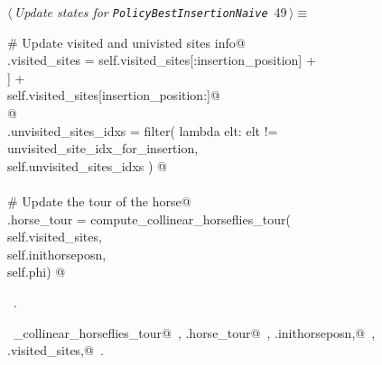 \documentclass[11.5pt]{report}
\begin{document}
\vspace{-0.8cm}\newchunk 

\begin{flushleft} \small\label{scrap73}\raggedright\small
{} $\langle\,${\itshape Update states for \texttt{PolicyBestInsertionNaive}}\nobreak\ {\footnotesize {49}}$\,\rangle\equiv$
\vspace{-1ex}
\begin{list}{}{} \item
\mbox{}\verb@# Update visited and univisted sites info@\\
\mbox{}\verb@self.visited_sites = self.visited_sites[:insertion_position]      +\@\\
\mbox{}\verb@                     [self.sites[unvisited_site_idx_for_insertion]] +\@\\
\mbox{}\verb@                     self.visited_sites[insertion_position:]@\\
\mbox{}\verb@  @\\
\mbox{}\verb@self.unvisited_sites_idxs = filter( lambda elt: elt != unvisited_site_idx_for_insertion, \@\\
\mbox{}\verb@                                    self.unvisited_sites_idxs ) @\\
\mbox{}\verb@@\\
\mbox{}\verb@# Update the tour of the horse@\\
\mbox{}\verb@self.horse_tour = compute_collinear_horseflies_tour(\@\\
\mbox{}\verb@                           self.visited_sites,         \@\\
\mbox{}\verb@                           self.inithorseposn, \@\\
\mbox{}\verb@                           self.phi) @\\
\mbox{}\verb@@{\NWsep}
\end{list}
\vspace{-1.5ex}
\footnotesize
\begin{list}{}{\setlength{\itemsep}{-\parsep}\setlength{\itemindent}{-\leftmargin}}
\item \NWtxtMacroRefIn\ .
\item \NWtxtIdentsUsed\nobreak\  \verb@compute_collinear_horseflies_tour@\nobreak\ , \verb@self.horse_tour@\nobreak\ , \verb@self.inithorseposn,@\nobreak\ , \verb@self.visited_sites,@\nobreak\ .
\item{}
\end{list}
\vspace{4ex}
\end{flushleft}
\newpage
\end{document}
